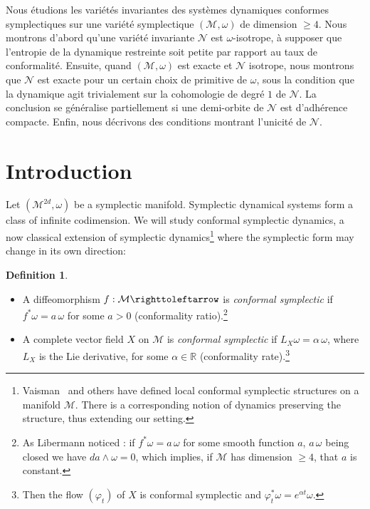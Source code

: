 \documentclass[JEP,XML,SOM,Unicode,published]{cedram}
\theoremstyle{definition}
\newtheorem{definition}[theorem]{Definition}
\def\R{\mathbb{R}}
\def\cM{{\mathcal M}}
\begin{document}
\begin{altabstract}
Nous étudions les variétés invariantes des systèmes dynamiques conformes symplectiques sur une variété symplectique $(\mathcal{M},\omega)$ de dimension $\geq 4$. Nous montrons d'abord qu'une variété invariante $\mathcal{N}$ est $\omega$-isotrope, à supposer que l'entropie de la dynamique restreinte soit petite par rapport au taux de conformalité. Ensuite, quand $(\mathcal{M},\omega)$ est exacte et $\mathcal{N}$ isotrope, nous montrons que $\mathcal{N}$ est exacte pour un certain choix de primitive de $\omega$, sous la condition que la dynamique agit trivialement sur la cohomologie de degré $1$ de $\mathcal{N}$. La conclusion se généralise partiellement si une demi-orbite de $\mathcal{N}$ est d'adhérence compacte. Enfin, nous décrivons des conditions montrant l'unicité de $\mathcal{N}$.
\end{altabstract}

\maketitle
\vspace*{-\baselineskip}
\tableofcontents
\mainmatter
\section{Introduction} \label{SecShortIntro}

Let $(\cM^{2d}, \omega)$ be a symplectic manifold. Symplectic dynamical systems form a class of infinite codimension. We will study conformal symplectic dynamics, a now classical extension of symplectic dynamics\footnote{Vaisman~\cite{Vaisman1985} and others have defined local conformal symplectic structures on a manifold $\cM$. There is a corresponding notion of dynamics preserving the structure, thus extending our setting.} where the symplectic form may change in its own direction:

\skpt
\begin{definition}
\begin{itemize}
\item A diffeomorphism $f: \cM \righttoleftarrow$ is \emph{conformal symplectic} if $f^*\omega=a\, \omega$ for some $a>0$ (conformality ratio).\footnote{As Libermann noticed \cite{Lib1959}: if $f^*\omega=a\, \omega$ for some smooth function $a$, $a\,\omega$ being closed we have $da \wedge \omega = 0$, which implies, if $\cM$ has dimension $\geq 4$, that $a$ is constant.}
\item A complete vector field $X$ on $\cM$ is \emph{conformal symplectic} if $L_X\omega=\alpha\, \omega$, where $L_X$ is the Lie derivative, for some $\alpha \in \R$ (conformality rate).\footnote{Then the flow $(\varphi_t)$ of $X$ is conformal symplectic and $\varphi_t^*\omega=e^{\alpha t}\omega$.}
\end{itemize}
\end{definition}
\end{document}
